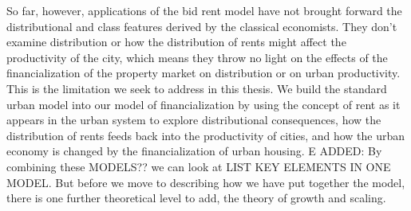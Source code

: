 So far, however, applications of the bid rent model have not brought forward the distributional and class features derived by the classical economists. They don't examine distribution or how the distribution of rents might affect the productivity of the city, which means they throw no light on the effects of the financialization of the property market on distribution or on urban productivity.  This is the limitation we seek to address in this thesis. We build the  standard urban model into our model of financialization by using the concept of rent as it appears in the urban system to explore distributional consequences, how the distribution of rents feeds back into the productivity of cities, and how the urban economy is changed by the financialization of urban housing. %
E ADDED: By combining these MODELS?? we can look at LIST KEY ELEMENTS IN ONE MODEL. But before we move to describing how we have put together the model, there is one further theoretical level to add, the theory of growth and scaling. 


